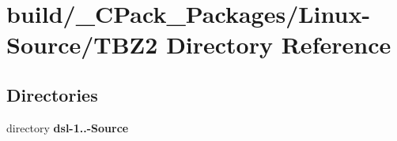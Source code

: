\section{build/\-\_\-\-C\-Pack\-\_\-\-Packages/\-Linux-\/\-Source/\-T\-B\-Z2 Directory Reference}
\label{dir_727ce01ce101a8196a51d0087333e0b1}
\subsection*{Directories}
\begin{DoxyCompactItemize}
\item 
directory {\bf dsl-\/1..-\/\-Source}
\end{DoxyCompactItemize}
